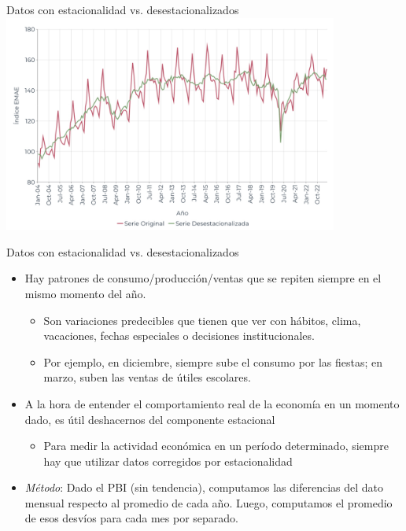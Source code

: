 \documentclass{beamer}
\begin{document}
\begin{frame}{Datos con estacionalidad vs. desestacionalizados}
\centering\includegraphics[width=11cm]{../Figures/M19.4.jpg}
\end{frame}

\begin{frame}{Datos con estacionalidad vs. desestacionalizados}
    \begin{itemize}
        \item Hay patrones de consumo/producción/ventas que se repiten siempre en el mismo momento del año.
            \begin{itemize}
            \item Son variaciones predecibles que tienen que ver con hábitos, clima, vacaciones, fechas especiales o decisiones institucionales.
            \item Por ejemplo, en diciembre, siempre sube el consumo por las fiestas; en marzo, suben las ventas de útiles escolares.
            \end{itemize} \vspace{1mm}
        \item A la hora de entender el comportamiento real de la economía en un momento dado, es útil deshacernos del componente estacional
        \begin{itemize}
            \item Para medir la actividad económica en un período determinado, siempre hay que utilizar datos corregidos por estacionalidad
            \end{itemize} \vspace{1mm}
        \item \textit{Método}: Dado el PBI (sin tendencia), computamos las diferencias del dato mensual respecto al promedio de cada año. Luego, computamos el promedio de esos desvíos para cada mes por separado. 
    \end{itemize}
\end{frame}
\end{document}
